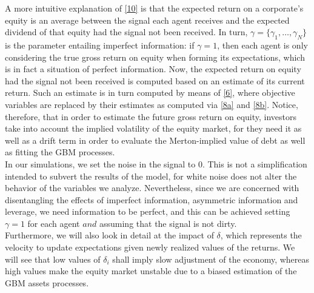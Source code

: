 \documentclass[11pt]{article}
\begin{document}
A more intuitive explanation of \eqref{10} is that the expected return on a corporate's equity is an average between the signal each agent receives and the expected dividend of that equity had the signal not been received. In turn, $\gamma =\{\gamma_1,\dots,\gamma_N\}$ is the parameter entailing imperfect information: if $\gamma=1$, then each agent is only considering the true gross return on equity when forming its expectations, which is in fact a situation of perfect information. Now, the expected return on equity had the signal not been received is computed based on an estimate of its current return. Such an estimate is in turn computed by means of \eqref{6}, where objective variables are replaced by their estimates as computed via \eqref{8a} and \eqref{8b}. Notice, therefore, that in order to estimate the future gross return on equity, investors take into account the implied volatility of the equity market, for they need it as well as a drift term in order to evaluate the Merton-implied value of debt as well as fitting the GBM processes.\\
In our simulations, we set the noise in the signal to $0$. This is not a simplification intended to subvert the results of the model, for white noise does not alter the behavior of the variables we analyze. Nevertheless, since we are concerned with disentangling the effects of imperfect information, asymmetric information and leverage, we need information to be perfect, and this can be achieved setting $\gamma=1$ for each agent $and$ assuming that the signal is not dirty.\\
Furthermore, we will also look in detail at the impact of $\delta$, which represents the velocity to update expectations given newly realized values of the returns. We will see that low values of $\delta_i$ shall imply slow adjustment of the economy, whereas high values make the equity market unstable due to a biased estimation of the GBM assets processes.
\end{document}

